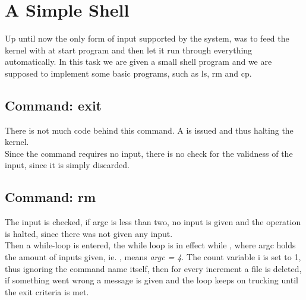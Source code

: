 %
%
%

\section{A Simple Shell}
Up until now the only form of input supported by the system, was to feed the
kernel with at start program and then let it run through everything
automatically. In this task we are given a small shell program and we are
supposed to implement some basic programs, such as ls, rm and cp.

\subsection{Command: exit}
There is not much code behind this command. A  is issued
and thus halting the kernel.\\
Since the command requires no input, there is no check for the validness of the
input, since it is simply discarded.

\subsection{Command: rm}
The input is checked, if argc is less than two, no input is given and the
operation is halted, since there was not given any input.\\
Then a while-loop is entered, the while loop is in effect while ,
where argc holds the amount of inputs given, ie. ,
means \textit{argc = 4}. The count variable i is set to 1, thus ignoring the
command name itself, then for every increment a file is deleted, if something
went wrong a message is given and the loop keeps on trucking until the exit
criteria is met. 

